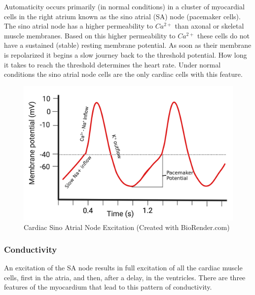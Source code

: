 Automaticity occurs primarily (in normal conditions) in a cluster of myocardial cells in the right atrium known as the sino atrial (SA) node (pacemaker cells). The sino atrial node has a higher permeability to $Ca^{2+}$ than axonal or skeletal muscle membranes. Based on this higher permeability to $Ca^{2+}$ these cells do not have a sustained (stable) resting membrane potential. As soon as their membrane is repolarized it begins a slow journey back to the threshold potential. How long it takes to reach the threshold determines the heart rate. Under normal conditions the sino atrial node cells are the only cardiac cells with this feature. 

\begin{figure}[!h]
    \centering
    \includegraphics[width=1\linewidth]{./figure/Cardiac_SA_Node_AP.png}
    \caption{Cardiac Sino Atrial Node Excitation \footnotesize{(Created with BioRender.com)}}
    \label{fig:Cardiac_SA_Node_AP}
\end{figure}

\subsubsection{Conductivity} 

An excitation of the SA node results in full excitation of all the cardiac muscle cells, first in the atria, and then, after a delay, in the ventricles. There are three features of the myocardium that lead to this pattern of conductivity. 

